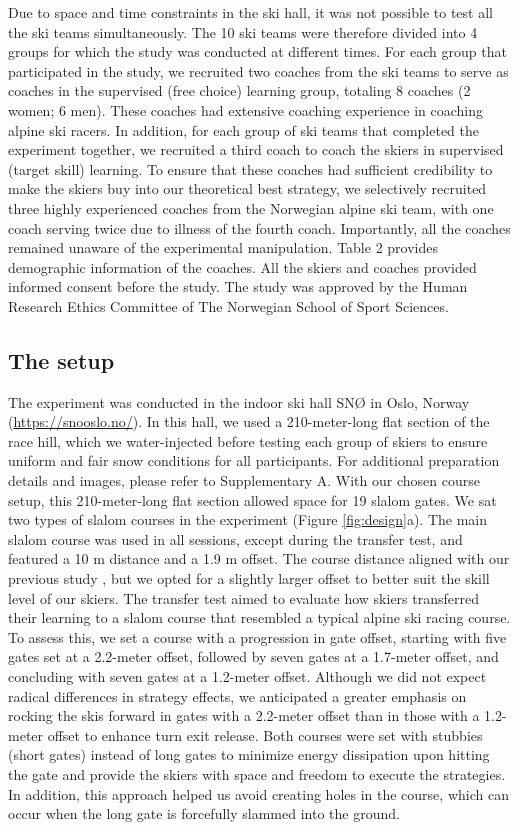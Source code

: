 \documentclass{article}
\begin{document}
Due to space and time constraints in the ski hall, it was not possible to test all the ski teams simultaneously. The 10 ski teams were therefore divided into 4 groups for which the study was conducted at different times. For each group that participated in the study, we recruited two coaches from the ski teams to serve as coaches in the supervised (free choice) learning group, totaling 8 coaches (2 women; 6 men). These coaches had extensive coaching experience in coaching alpine ski racers. In addition, for each group of ski teams that completed the experiment together, we recruited a third coach to coach the skiers in supervised (target skill) learning. To ensure that these coaches had sufficient credibility to make the skiers buy into our theoretical best strategy, we selectively recruited three highly experienced coaches from the Norwegian alpine ski team, with one coach serving twice due to illness of the fourth coach. Importantly, all the coaches remained unaware of the experimental manipulation. Table 2 provides demographic information of the coaches. All the skiers and coaches provided informed consent before the study. The study was approved by the Human Research Ethics Committee of The Norwegian School of Sport Sciences.


\subsection{The setup}
The experiment was conducted in the indoor ski hall SNØ in Oslo, Norway (\url{https://snooslo.no/}). In this hall, we used a 210-meter-long flat section of the race hill, which we water-injected before testing each group of skiers to ensure uniform and fair snow conditions for all participants. For additional preparation details and images, please refer to Supplementary A. With our chosen course setup, this 210-meter-long flat section allowed space for 19 slalom gates. We sat two types of slalom courses in the experiment (Figure \ref{fig:design}a). The main slalom course was used in all sessions, except during the transfer test, and featured a 10 m distance and a 1.9 m offset. The course distance aligned with our previous study \cite{magelssen_is_2022}, but we opted for a slightly larger offset to better suit the skill level of our skiers. The transfer test aimed to evaluate how skiers transferred their learning to a slalom course that resembled a typical alpine ski racing course. To assess this, we set a course with a progression in gate offset, starting with five gates set at a 2.2-meter offset, followed by seven gates at a 1.7-meter offset, and concluding with seven gates at a 1.2-meter offset. Although we did not expect radical differences in strategy effects, we anticipated a greater emphasis on rocking the skis forward in gates with a 2.2-meter offset than in those with a 1.2-meter offset to enhance turn exit release. Both courses were set with stubbies (short gates) instead of long gates to minimize energy dissipation upon hitting the gate \cite{minetti_biomechanics_2018} and provide the skiers with space and freedom to execute the strategies. In addition, this approach helped us avoid creating holes in the course, which can occur when the long gate is forcefully slammed into the ground.
\end{document}
